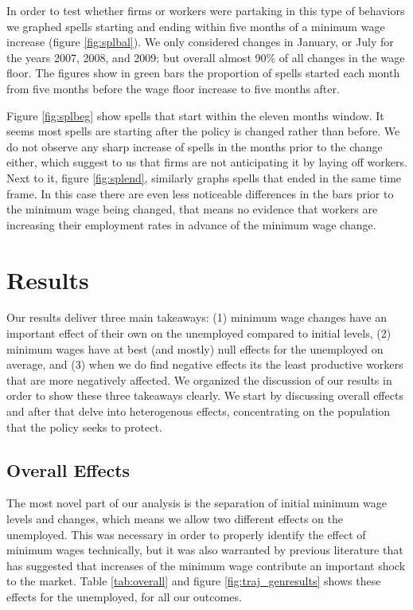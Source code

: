 \documentclass{article}
\begin{document}
In order to test whether firms or workers were partaking in this type of behaviors we graphed spells starting and ending within five months of a minimum wage increase (figure \ref{fig:splbal}). We only considered changes in January, or July for the years 2007, 2008, and 2009; but overall almost 90\% of all changes in the wage floor. The figures show in green bars the proportion of spells started each month from five months before the wage floor increase to five months after.

Figure \ref{fig:splbeg} show spells that start within the eleven months window. It seems most spells are starting after the policy is changed rather than before. We do not observe any sharp increase of spells in the months prior to the change either, which suggest to us that firms are not anticipating it by laying off workers. Next to it, figure \ref{fig:splend}, similarly graphs spells that ended in the same time frame. In this case there are even less noticeable differences in the bars prior to the minimum wage being changed, that means no evidence that workers are increasing their employment rates in advance of the minimum wage change. 

\section{Results}
Our results deliver three main takeaways: (1) minimum wage changes have an important effect of their own on the unemployed compared to initial levels, (2) minimum wages have at best (and mostly) null effects for the unemployed on average, and (3) when we do find negative effects its the least productive workers that are more negatively affected. We organized the discussion of our results in order to show these three takeaways clearly. We start by discussing overall effects and after that delve into heterogenous effects, concentrating on the population that the policy seeks to protect.

\subsection{Overall Effects}
The most novel part of our analysis is the separation of initial minimum wage levels and changes, which means we allow two different effects on the unemployed. This was necessary in order to properly identify the effect of  minimum wages technically, but it was also warranted by previous literature that has suggested that increases of the minimum wage contribute an important shock to the market. Table \ref{tab:overall} and figure \ref{fig:traj_genresults} shows these effects for the unemployed, for all our outcomes.
\end{document}
